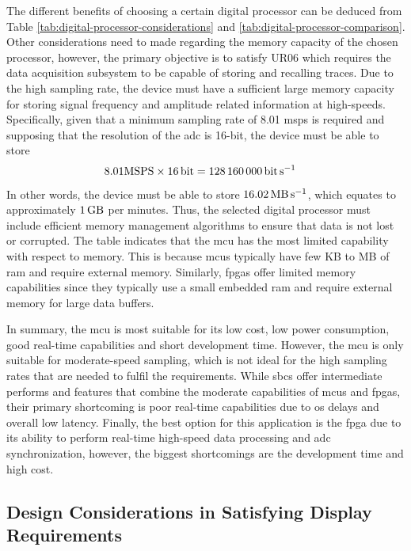 \documentclass[class=report,11pt,crop=false]{standalone}
\begin{document}
	The different benefits of choosing a certain digital processor can be deduced from Table \ref{tab:digital-processor-considerations} and \ref{tab:digital-processor-comparison}. Other considerations need to made regarding the memory capacity of the chosen processor, however, the primary objective is to satisfy UR06 which requires the data acquisition subsystem to be capable of storing and recalling traces. Due to the high sampling rate, the device must have a sufficient large memory capacity for storing signal frequency and amplitude related information at high-speeds. Specifically, given that a minimum sampling rate of 8.01 \acrshort{msps} is required and supposing that the resolution of the \acrshort{adc} is 16-bit, the device must be able to store
	\begin{align}
		8.01 \text{MSPS} \times \SI{16}{\bit} & = \SI{128160000}{\bit\per\second}\nonumber
	\end{align}
	In other words, the device must be able to store $\SI{16.02}{\mega\byte\per\second}$, which equates to approximately $\SI{1}{\giga\byte}$ per minutes. Thus, the selected digital processor must include efficient memory management algorithms to ensure that data is not lost or corrupted. The table indicates that the \acrshort{mcu} has the most limited capability with respect to memory. This is because \acrshort{mcu}s typically have few KB to MB of \acrshort{ram} and require external memory. Similarly, \acrshort{fpga}s offer limited memory capabilities since they typically use a small embedded \acrshort{ram} and require external memory for large data buffers. 
	
	In summary, the \acrshort{mcu} is most suitable for its low cost, low power consumption, good real-time capabilities and short development time. However, the \acrshort{mcu} is only suitable for moderate-speed sampling, which is not ideal for the high sampling rates that are needed to fulfil the requirements. While \acrshort{sbc}s offer intermediate performs and features that combine the moderate capabilities of \acrshort{mcu}s and \acrshort{fpga}s, their primary shortcoming is poor real-time capabilities due to \acrshort{os} delays and overall low latency. Finally, the best option for this application is the \acrshort{fpga} due to its ability to perform real-time high-speed data processing and \acrshort{adc} synchronization, however, the biggest shortcomings are the development time and high cost. 
	
	\subsection{Design Considerations in Satisfying Display Requirements}
	
\end{document}
